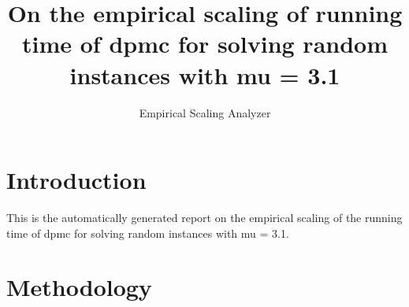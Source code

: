 \newcommand{\updatedYP}[1]{#1}
\newcommand{\yp}[1]{#1}
\newcommand{\orange}[1]{#1}
\newcommand{\evalModels}[1]{#1}
\newcommand{\bestBoot}[1]{#1}

\newcommand{\medianInterval}[1]{}
\newcommand{\randomizedAlgorithm}[1]{}
\newcommand{\quantileRegression}[1]{}
\renewcommand{\quantileRegression}[1]{#1}

\makeatletter

\providecommand{\tabularnewline}{\\}


\title{On the empirical scaling of running time of dpmc for solving random instances with mu = 3.1}
\author{Empirical Scaling Analyzer}

\makeatother

\usepackage{babel}

\maketitle %


\section{Introduction}

This is the automatically generated report on the empirical scaling
of the running time of dpmc for solving random instances with mu = 3.1.


\section{Methodology}

\label{sec:Methodology}

